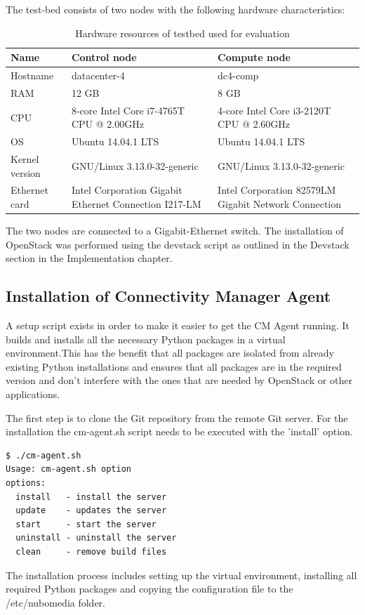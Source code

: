 The test-bed consists of two nodes with the following hardware characteristics:

\begin{table}[H]
\centering

\begin{tabularx}{\textwidth}{ |X|X|X| }
\hline Name & \textbf{Control node} & \textbf{Compute node} \\ 
\hline Hostname & datacenter-4 & dc4-comp \\ 
\hline RAM & 12 GB & 8 GB \\ 
\hline CPU & 8-core Intel Core i7-4765T CPU @ 2.00GHz & 4-core Intel Core i3-2120T CPU @ 2.60GHz \\ 
\hline OS & Ubuntu 14.04.1 LTS & Ubuntu 14.04.1 LTS \\ 
\hline Kernel version & GNU/Linux 3.13.0-32-generic & GNU/Linux 3.13.0-32-generic \\
\hline Ethernet card & Intel Corporation Gigabit Ethernet Connection I217-LM & Intel Corporation 82579LM Gigabit Network Connection \\ 
\hline 
\end{tabularx}

\caption{Hardware resources of testbed used for evaluation}
\end{table}


The two nodes are connected to a Gigabit-Ethernet switch. The installation of OpenStack was performed using the devstack script as outlined in the Devstack section in the Implementation chapter.

\subsection{Installation of Connectivity Manager Agent}

A setup script exists in order to make it easier to get the CM Agent running. It builds and installs all the necessary Python packages in a virtual environment.This has the benefit that all packages are isolated from already existing Python installations and ensures that all packages are in the required version and don't interfere with the ones that are needed by OpenStack or other applications. 

The first step is to clone the Git repository from the remote Git server. For the installation the cm-agent.sh script needs to be executed with the 'install' option.

\begin{lstlisting}[language=commands]
$ ./cm-agent.sh
Usage: cm-agent.sh option
options:
  install   - install the server
  update    - updates the server
  start     - start the server
  uninstall - uninstall the server
  clean     - remove build files
\end{lstlisting}
The installation process includes setting up the virtual environment, installing all required Python packages and copying the configuration file to the /etc/nubomedia folder.

